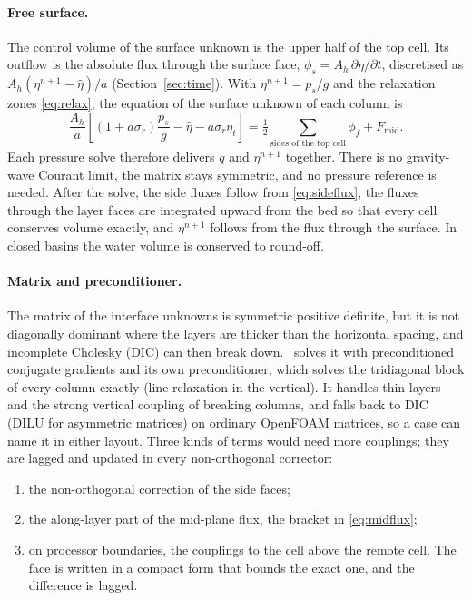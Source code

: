 \paragraph{Free surface.}
\label{sec:freesurface}
The control volume of the surface unknown is the upper half of the top cell.
Its outflow is the absolute flux through the surface face,
$\phi_s = A_h\,\partial\eta/\partial t$, discretised as
$A_h(\eta^{n+1}-\hat\eta)/a$ (Section~\ref{sec:time}). With
$\eta^{n+1}=p_s/g$ and the relaxation zones \eqref{eq:relax}, the equation of the
surface unknown of each column is
\begin{equation}
  \frac{A_h}{a}\left[(1 + a\sigma_r)\frac{p_s}{g} - \hat\eta - a\sigma_r\eta_t\right]
  = \tfrac12\sum_{\text{sides of the top cell}}\phi_f + F_{\mathrm{mid}} .
  \label{eq:surface}
\end{equation}
Each pressure solve therefore delivers $q$ and $\eta^{n+1}$ together. There is
no gravity-wave Courant limit, the matrix stays symmetric, and no pressure
reference is needed. After the solve, the side fluxes follow from
\eqref{eq:sideflux}, the fluxes through the layer faces are integrated upward
from the bed so that every cell conserves volume exactly, and
$\eta^{n+1}$ follows from the flux through the surface. In closed basins the
water volume is conserved to round-off.

\paragraph{Matrix and preconditioner.} The matrix of the interface unknowns is
symmetric positive definite, but it is not diagonally dominant where the
layers are thicker than the horizontal spacing, and incomplete Cholesky (DIC)
can then break down. \NHFOAM\ solves it with preconditioned conjugate gradients
and its own  preconditioner, which solves the tridiagonal
block of every column exactly (line relaxation in the vertical). It handles
thin layers and the strong vertical coupling of breaking columns, and falls
back to DIC (DILU for asymmetric matrices) on ordinary OpenFOAM matrices, so a
case can name it in either layout. Three kinds of terms would need more
couplings; they are lagged and updated in every non-orthogonal corrector:
\begin{enumerate}[nosep]
  \item the non-orthogonal correction of the side faces;
  \item the along-layer part of the mid-plane flux, the bracket in
        \eqref{eq:midflux};
  \item on processor boundaries, the couplings to the cell above the remote
        cell. The face is written in a compact form that bounds the exact one,
        and the difference is lagged.
\end{enumerate}

